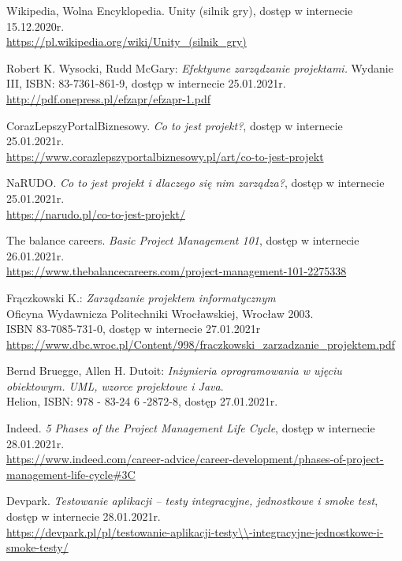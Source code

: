 \documentclass[oneside,polski,logo]{amuthesis}
\begin{document}
\begin{thebibliography}{100} 

\addtolength{\leftmargin}{0.2in} 
\setlength{\itemindent}{-0.2in}

Wikipedia, Wolna Encyklopedia. Unity (silnik gry), dostęp w internecie 15.12.2020r.\\
\url{https://pl.wikipedia.org/wiki/Unity\_(silnik\_gry)}

Robert K. Wysocki, Rudd McGary: \emph{Efektywne zarządzanie projektami.} Wydanie III, ISBN: 83-7361-861-9, dostęp w internecie 25.01.2021r.\\
\url{http://pdf.onepress.pl/efzapr/efzapr-1.pdf}

CorazLepszyPortalBiznesowy. \emph{Co to jest projekt?}, dostęp w internecie 25.01.2021r.\\
\url{https://www.corazlepszyportalbiznesowy.pl/art/co-to-jest-projekt}

NaRUDO. \emph{Co to jest projekt i dlaczego się nim zarządza?}, dostęp w internecie 25.01.2021r.\\
\url{https://narudo.pl/co-to-jest-projekt/}

The balance careers. \emph{Basic Project Management 101}, dostęp w internecie 26.01.2021r.\\
\url{https://www.thebalancecareers.com/project-management-101-2275338}

Frączkowski K.: \emph{Zarządzanie projektem informatycznym}\\
Oficyna Wydawnicza Politechniki Wrocławskiej, Wrocław 2003.\\
ISBN 83-7085-731-0, dostęp w internecie 27.01.2021r\\
\url{https://www.dbc.wroc.pl/Content/998/fraczkowski\_zarzadzanie\_projektem.pdf}

Bernd Bruegge, Allen H. Dutoit: \emph{Inżynieria oprogramowania w ujęciu obiektowym. UML, wzorce projektowe i Java}.\\
Helion, ISBN: 978 - 83-24 6 -2872-8, dostęp 27.01.2021r.

Indeed. \emph{5 Phases of the Project Management Life Cycle}, dostęp w internecie 28.01.2021r.\\
\url{https://www.indeed.com/career-advice/career-development/phases-of-project-management-life-cycle\#3C}

Devpark. \emph{Testowanie aplikacji – testy integracyjne, jednostkowe i smoke test}, dostęp w internecie 28.01.2021r.\\
\url{https://devpark.pl/pl/testowanie-aplikacji-testy\\-integracyjne-jednostkowe-i-smoke-testy/}


\end{thebibliography}
\end{document}
